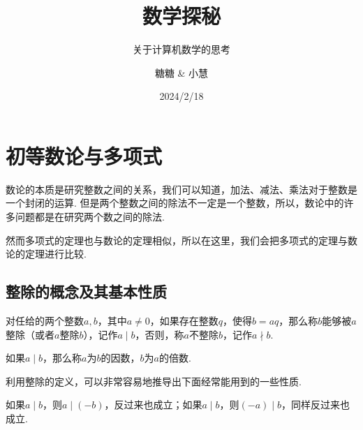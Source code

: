 \documentclass[lang=cn,newtx,10pt,scheme=chinese]{elegantbook}
\title{数学探秘}
\subtitle{关于计算机数学的思考}
\author{糖糖 \& 小慧}
\date{2024/2/18}
\begin{document}
\maketitle

\frontmatter
\tableofcontents

\mainmatter
	
\chapter{初等数论与多项式}
数论的本质是研究整数之间的关系，我们可以知道，加法、减法、乘法对于整数是一个封闭的运算. 但是两个整数之间的除法不一定是一个整数，所以，数论中的许多问题都是在研究两个数之间的除法.

然而多项式的定理也与数论的定理相似，所以在这里，我们会把多项式的定理与数论的定理进行比较.

\section{整除的概念及其基本性质}
\begin{definition}[整数整除的定义]
对任给的两个整数$a,b$，其中$a\neq 0$，如果存在整数$q$，使得$b=aq$，那么称$b$能够被$a$整除（或者$a$整除$b$），记作$a\mid b$，否则，称$a$不整除$b$，记作$a\nmid b$.
\end{definition}

\begin{definition}[整数的因数与倍数]
如果$a\mid b$，那么称$a$为$b$的因数，$b$为$a$的倍数.
\end{definition}

利用整除的定义，可以非常容易地推导出下面经常能用到的一些性质.

\begin{property}
如果$a\mid b$，则$a\mid (-b)$，反过来也成立；如果$a\mid b$，则$(-a)\mid b$，同样反过来也成立.
\end{property}
\end{document}
